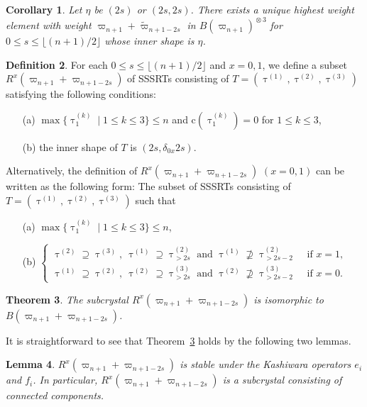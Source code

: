 \documentclass[11pt, leqno]{amsart}
\theoremstyle{plain}
\newtheorem{theorem}{Theorem}[section]
\newtheorem{lemma}[theorem]{Lemma}
\newtheorem{corollary}[theorem]{Corollary}
\theoremstyle{definition}
\newtheorem{definition}[theorem]{Definition}
\numberwithin{equation}{section}
\newcommand{\fw}{\varpi} %
\newcommand{\tfw}{\widetilde{\fw}} %
\newcommand{\ntau}[1]{\btau^{(#1)}}
\newcommand{\clr}{\mathrm{c}}
\newcommand{\btau}{\uptau}
\newcommand{\tens}{\mathop\otimes}
\begin{document}
\begin{corollary} \label{cor: unique}
Let $\eta$ be $(2s)$ or $(2s,2s)$.
There exists a unique highest weight element with weight $\fw_{n+1}+\tfw_{n+1-2s}$ in $B(\fw_{n+1})^{\tens 3}$ for $0 \le s \le \lfloor (n+1)/2\rfloor$ whose inner shape is $\eta$.
\end{corollary}

\begin{definition} For each $0 \le s \le \lfloor (n+1)/2 \rfloor$ and $x=0,1$, we define a subset $R^x(\fw_{n+1}+\fw_{n+1-2s})$ of SSSRTs consisting of $T = (\ntau{1},\ntau{2},\ntau{3})$ satisfying the following conditions:
\begin{enumerate}
\item[{\rm (a)}] $\max\{ \ntau{k}_1 \mid 1 \le k \le 3 \} \le n$ and $\clr(\ntau{k}_1)=0$ for $1 \le k \le 3$,
\item[{\rm (b)}] the inner shape of $T$ is $(2s,\delta_{0x}2s)$.
\end{enumerate}
\end{definition}

Alternatively, the definition of $R^x(\fw_{n+1}+\fw_{n+1-2s})$ $(x=0,1)$ can be written as the following form: The subset of SSSRTs consisting of $T=(\ntau{1},\ntau{2},\ntau{3})$ such that
\begin{enumerate}
\item[{\rm (a)}] $\max\{ \ntau{k}_1 \mid 1 \le k \le 3 \} \le n$,
\item[{\rm (b)}] $\begin{cases}
\ntau{2} \supseteq \ntau{3},  \ \ntau{1} \supseteq \ntau{2}_{> 2s} \text{ and } \ntau{1} \not\supseteq \ntau{2}_{> 2s-2} & \text{ if } x =1, \\
\ntau{1} \supseteq \ntau{2},  \ \ntau{2} \supseteq \ntau{3}_{> 2s} \text{ and } \ntau{2} \not\supseteq \ntau{3}_{> 2s-2} & \text{ if } x =0.
\end{cases}
$
\end{enumerate}

\begin{theorem}
\label{thm: main Rd}
The subcrystal $R^x(\fw_{n+1}+\fw_{n+1-2s})$ is isomorphic to $B(\fw_{n+1}+\fw_{n+1-2s})$.
\end{theorem}

It is straightforward to see that Theorem~\ref{thm: main Rd} holds by the following two lemmas.

\begin{lemma} \label{lem: stable Rd}
$R^x(\fw_{n+1}+\fw_{n+1-2s})$ is stable under the Kashiwara operators $e_i$ and $f_i$. In particular, $R^x(\fw_{n+1}+\fw_{n+1-2s})$ is a subcrystal consisting of connected components.
\end{lemma}
\end{document}
